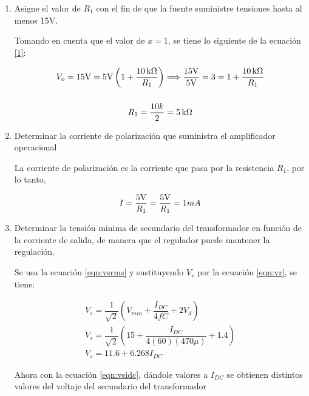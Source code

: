 \begin{enumerate}
\begin{enumerate}
                \item Asigne el valor de $R_1$ con el fin de que la fuente suministre tensiones hasta al menos 15V.

                    Tomando en cuenta que el valor de $x=1$, se tiene lo siguiente de la ecuación \ref{1}:

                    \begin{gather}
                        V_o=15\volt=5\volt\left(1+\dfrac{\SI{10}{\kilo\ohm}}{R_1}\right)\Longrightarrow \dfrac{15\volt}{5\volt}=3=1+\dfrac{\SI{10}{\kilo\ohm}}{R_1}\nonumber\\[0.5cm]
                        R_1=\dfrac{10k}{2}=\SI{5}{\kilo\ohm}
                    \end{gather}

                \item Determinar la corriente de polarización que suministra el amplificador operacional 

                    La corriente de polarización es la corriente que pasa por la resistencia $R_1$, por lo tanto,
                    
                    \begin{gather*}
                        I=\dfrac{5\volt}{R_1}= \dfrac{5\volt}{R_1}=1mA
                    \end{gather*}

                \item Determinar la tensión minima de secundario del transformador en función de la corriente de salida, de manera que el regulador puede mantener la regulación.

                    Se usa la ecuación \ref{eqn:vsrms} y sustituyendo $V_r$ por la ecuación \ref{eqn:vr}, se tiene:

                    \begin{gather}
                        V_s = \dfrac{1}{\sqrt{2}}\left(V_{min} + \dfrac{I_{DC}}{4fC} + 2V_d\right) \nonumber\\[0.5cm]
                        V_s = \dfrac{1}{\sqrt{2}}\left(15 + \dfrac{I_{DC}}{4(60)(470\mu)} + 1.4\right) \nonumber\\[0.5cm]
                        V_s = 11.6+6.268 I_{DC} \label{eqn:vsidc}               
                    \end{gather}

                    Ahora con la ecuación \ref{eqn:vsidc}, dándole valores a $I_{DC}$ se obtienen distintos valores del voltaje del secundario del transformador


\end{enumerate}
\end{enumerate}
